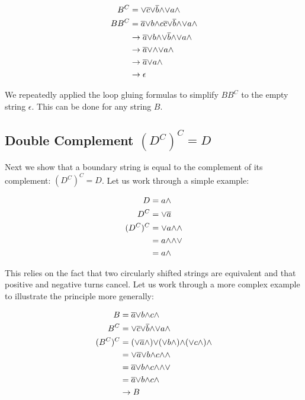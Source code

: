 \documentclass[acmtog]{acmart}
\begin{document}
\begin{equation}
\begin{split}
B^C  & = {\vee} \overline{c} {\vee} \overline{b} {\wedge} {\vee} a {\wedge} \\
BB^C & = \overline{a} {\vee} b {\wedge} c \overline{c} {\vee} \overline{b} {\wedge} {\vee} a {\wedge} \\
     & \rightarrow \overline{a} {\vee} b {\wedge} {\vee} \overline{b} {\wedge} {\vee} a {\wedge} \\
     & \rightarrow \overline{a} {\vee} {\wedge} {\vee} a {\wedge} \\
     & \rightarrow \overline{a} {\vee} a {\wedge} \\
     & \rightarrow \epsilon
\end{split}
\end{equation}

We repeatedly applied the loop gluing formulas to simplify $BB^C$ to the empty
string $\epsilon$. This can be done for any string $B$.

\subsection{Double Complement $(D^C)^C=D$}

Next we show that a boundary string is equal to the complement of its
complement: $(D^C)^C=D$. Let us work through a simple example:

\begin{equation} \label{eq1}
\begin{split}
D    & = a {\wedge} \\
D^C  & = {\vee} \overline{a} \\
(D^C)^C  & = {\vee} a {\wedge} {\wedge} \\
         & = a {\wedge} {\wedge} {\vee} \\
         & = a {\wedge} \\
\end{split}
\end{equation}

This relies on the fact that two circularly shifted strings are equivalent 
and that positive and negative turns cancel. Let us work through a more 
complex example to illustrate the principle more generally:

\begin{equation}
\begin{split}
B       & = \overline{a} {\vee} b {\wedge} c {\wedge} \\
B^C     & = {\vee} \overline{c} {\vee} \overline{b} {\wedge} {\vee} a {\wedge} \\
(B^C)^C & = ({\vee} \overline{a} {\wedge}) {\vee} ({\vee} b {\wedge}) {\wedge} ({\vee} c {\wedge}) {\wedge} \\
        & = {\vee} \overline{a} {\vee} b {\wedge} c {\wedge} {\wedge} \\
        & = \overline{a} {\vee} b {\wedge} c {\wedge} {\wedge} {\vee} \\
        & = \overline{a} {\vee} b {\wedge} c {\wedge} \\
        & \rightarrow B \\
\end{split}
\end{equation}
\end{document}
